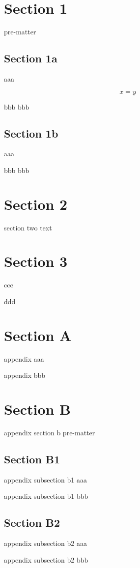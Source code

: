 \documentclass{article}
\begin{document}
\maketitle

\section{Section 1}
\label{sec:1}
pre-matter

\subsection{Section 1a}
\label{sec:1a}
aaa

\begin{equation}
x = y  \label{eq:1a}
\end{equation}

bbb
bbb

\subsection{Section 1b}
aaa

bbb
bbb
\label{sec:1b}

\section{Section 2}
section two text

\section{Section 3}
\label{sec:3}
ccc

ddd

\appendix

\section{Section A}
\label{app:sec:A}
appendix aaa

appendix bbb

\section{Section B}
\label{app:sec:B}
appendix section b pre-matter

\subsection{Section B1}
\label{app:sec:B1}
appendix subsection b1 aaa

appendix subsection b1 bbb

\subsection{Section B2}
\label{app:sec:B2}
appendix subsection b2 aaa

appendix subsection b2 bbb
\end{document}
